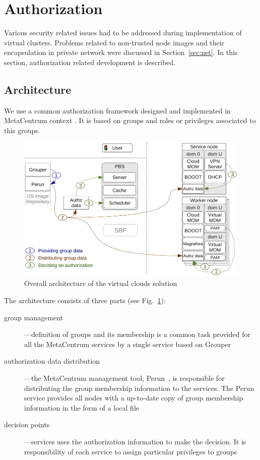 \documentclass[a4paper]{article}
\begin{document}
\section{Authorization}
\label{Authorization}

Various security related issues had to be addressed during implementation of virtual clusters. Problems related to 
non-trusted node images and their encapsulation in private network were discussed in Section~\ref{sec:net}. 
In this section, authorization related development is described. 

\subsection{Architecture}
We use a common authorization framework designed and implemented in
MetaCentrum context \cite{metaauth}. It is based on groups and roles
or privileges associated to this groups. 


\begin{figure}[htb]
\begin{center}
    \includegraphics[width=.8\columnwidth]{auth_arch.pdf}
\end{center}
    \caption{Overall architecture of the virtual clouds solution}
    \label{fig:authz}
\end{figure}

The architecture consists of three parts (see Fig.~\ref{fig:authz}):
\begin{description}
 \item [group management]---definition of groups and its membership
   is a common task provided for all the MetaCentrum services by a
   single service based on Grouper~\cite{grouper}
 \item [authorization data distribution]---the MetaCentrum management
   tool, Perun~\cite{Perun}, is responsible for distributing the
   group membership information to the services. The Perun service
   provides all nodes with a up-to-date copy of group membership
   information in the form of a local file
 \item [decision points]---services uses the authorization
   information to make the decision. It is responsibility of each service
   to assign particular privileges to groups
\end{description}
\end{document}
